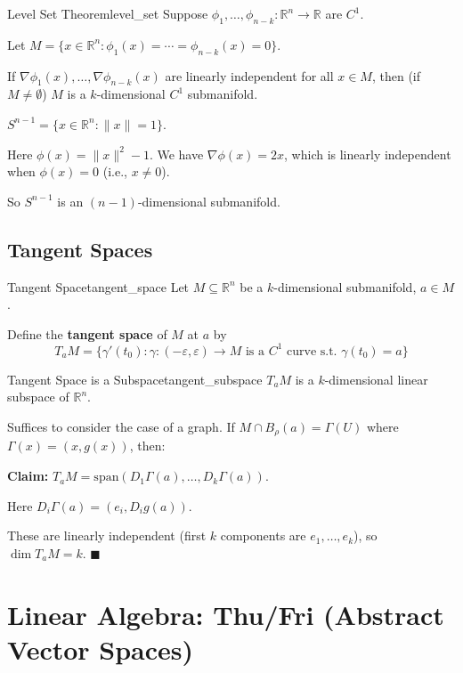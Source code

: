 \documentclass[11pt, letterpaper, openany]{book}
\renewenvironment{proof}[1][\proofname]{%
  \tcolorbox[blanker, breakable, left=1em,
    before skip=1em, after skip=1em,
    borderline west={2pt}{0pt}{MagicTeal!50},
    colback=MagicCream,
    before upper={\textcolor{MagicTeal}{\sffamily\bfseries #1.}\space}
  ]%
}{%
  \hfill\textcolor{MagicTeal}{\ensuremath{\blacksquare}}\endtcolorbox%
}
\begin{document}
\begin{thm}{Level Set Theorem}{level_set}
Suppose $\phi_1, \ldots, \phi_{n-k}: \mathbb{R}^n \to \mathbb{R}$ are $C^1$.

Let $M = \{x \in \mathbb{R}^n : \phi_1(x) = \cdots = \phi_{n-k}(x) = 0\}$.

If $\nabla\phi_1(x), \ldots, \nabla\phi_{n-k}(x)$ are linearly independent for all $x \in M$, then (if $M \neq \emptyset$) $M$ is a $k$-dimensional $C^1$ submanifold.
\end{thm}

\begin{example}
$S^{n-1} = \{x \in \mathbb{R}^n : \|x\| = 1\}$.

Here $\phi(x) = \|x\|^2 - 1$. We have $\nabla\phi(x) = 2x$, which is linearly independent when $\phi(x) = 0$ (i.e., $x \neq 0$).

So $S^{n-1}$ is an $(n-1)$-dimensional submanifold.
\end{example}

\subsection{Tangent Spaces}

\begin{defn}{Tangent Space}{tangent_space}
Let $M \subseteq \mathbb{R}^n$ be a $k$-dimensional submanifold, $a \in M$.

Define the \textbf{tangent space} of $M$ at $a$ by
\[T_a M = \{\gamma'(t_0) : \gamma: (-\varepsilon, \varepsilon) \to M \text{ is a $C^1$ curve s.t. } \gamma(t_0) = a\}\]
\end{defn}

\begin{thm}{Tangent Space is a Subspace}{tangent_subspace}
$T_a M$ is a $k$-dimensional linear subspace of $\mathbb{R}^n$.
\end{thm}

\begin{proof}[Sketch]
Suffices to consider the case of a graph. If $M \cap B_\rho(a) = \Gamma(U)$ where $\Gamma(x) = (x, g(x))$, then:

\textbf{Claim:} $T_a M = \text{span}(D_1 \Gamma(a), \ldots, D_k \Gamma(a))$.

Here $D_i \Gamma(a) = (e_i, D_i g(a))$.

These are linearly independent (first $k$ components are $e_1, \ldots, e_k$), so $\dim T_a M = k$.
\end{proof}

\section{Linear Algebra: Thu/Fri (Abstract Vector Spaces)}
\end{document}
